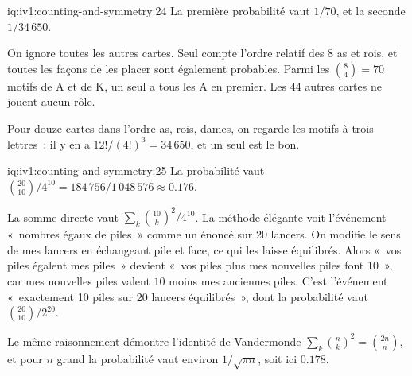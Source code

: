 \begin{solution}{iq:iv1:counting-and-symmetry:24}
La première probabilité vaut $1/70$, et la seconde $1/34\,650$.

On ignore toutes les autres cartes. Seul compte l'ordre relatif des 8 as et rois, et toutes les façons de les placer sont également probables. Parmi les $\binom{8}{4} = 70$ motifs de A et de K, un seul a tous les A en premier. Les 44 autres cartes ne jouent aucun rôle.

Pour douze cartes dans l'ordre as, rois, dames, on regarde les motifs à trois lettres~: il y en a $12!/(4!)^3 = 34\,650$, et un seul est le bon.


\end{solution}

\begin{solution}{iq:iv1:counting-and-symmetry:25}
La probabilité vaut $\binom{20}{10}/4^{10} = 184\,756/1\,048\,576 \approx 0.176$.

La somme directe vaut $\sum_k \binom{10}{k}^2 / 4^{10}$. La méthode élégante voit l'événement «~nombres égaux de piles~» comme un énoncé sur 20 lancers. On modifie le sens de mes lancers en échangeant pile et face, ce qui les laisse équilibrés. Alors «~vos piles égalent mes piles~» devient «~vos piles plus mes nouvelles piles font 10~», car mes nouvelles piles valent $10$ moins mes anciennes piles. C'est l'événement «~exactement 10 piles sur 20 lancers équilibrés~», dont la probabilité vaut $\binom{20}{10}/2^{20}$.

Le même raisonnement démontre l'identité de Vandermonde $\sum_k \binom{n}{k}^2 = \binom{2n}{n}$, et pour $n$ grand la probabilité vaut environ $1/\sqrt{\pi n}$, soit ici $0.178$.

\end{solution}

